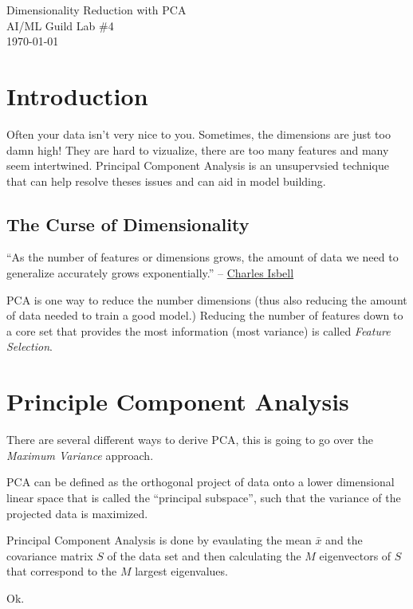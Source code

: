 \documentclass[letterpaper,12pt]{article}
\begin{document}
\begin{flushleft}
Dimensionality Reduction with PCA\\
AI/ML Guild Lab \#4\\
\today \\
\end{flushleft}

\section{Introduction}

Often your data isn't very nice to you. Sometimes, the dimensions are just too damn
high! They are hard to vizualize, there are too many features and many seem
intertwined. Principal Component Analysis is an unsupervsied technique that can help
resolve theses issues and can aid in model building.

\subsection{The Curse of Dimensionality}

``As the number of features or dimensions grows, the amount of data we need to
generalize accurately grows exponentially.''
-- \href{https://www.cc.gatech.edu/people/charles-isbell}{Charles Isbell}

PCA is one way to reduce the number dimensions (thus also reducing the amount of
data needed to train a good model.) Reducing the number of features down to a
core set that provides the most information (most variance) is called
\emph{Feature Selection}.

\section{Principle Component Analysis}

There are several different ways to derive PCA, this is going to go over the
\emph{Maximum Variance} approach.

PCA can be defined as the orthogonal project of data onto a lower dimensional
linear space that is called the ``principal subspace'', such that the variance
of the projected data is maximized.

Principal Component Analysis is done by evaulating the mean $\bar{x}$ and the
covariance matrix $S$ of the data set and then calculating the $M$ eigenvectors
of $S$ that correspond to the $M$ largest eigenvalues.

Ok.
\end{document}
